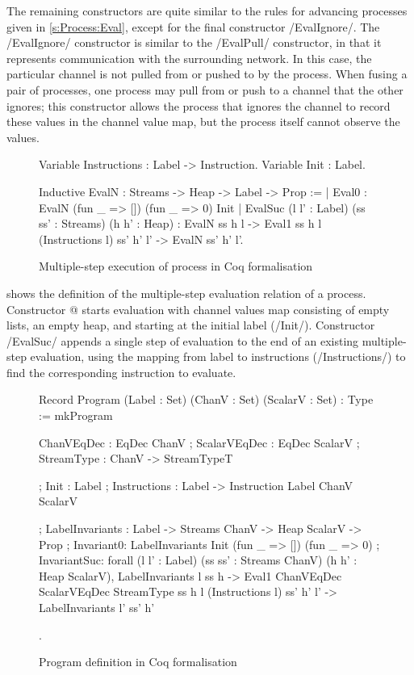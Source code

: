 The remaining constructors are quite similar to the rules for advancing processes given in \cref{s:Process:Eval}, except for the final constructor \Hs/EvalIgnore/.
The \Hs/EvalIgnore/ constructor is similar to the \Hs/EvalPull/ constructor, in that it represents communication with the surrounding network.
In this case, the particular channel is not pulled from or pushed to by the process.
When fusing a pair of processes, one process may pull from or push to a channel that the other ignores; this constructor allows the process that ignores the channel to record these values in the channel value map, but the process itself cannot observe the values.

\begin{figure}
\begin{coq}
Variable Instructions : Label -> Instruction.
Variable Init         : Label.

Inductive EvalN : Streams -> Heap -> Label -> Prop :=
  | Eval0
     : EvalN (fun _ => []) (fun _ => 0) Init
  | EvalSuc (l l' : Label) (ss ss' : Streams) (h h' : Heap)
     : EvalN ss h l
    -> Eval1 ss h l (Instructions l) ss' h' l'
    -> EvalN                         ss' h' l'.
\end{coq}
\caption{Multiple-step execution of process in Coq formalisation}
\label{figs/coq/multi-step}
\end{figure}

 shows the definition of the multiple-step evaluation relation of a process.
Constructor @ starts evaluation with channel values map consisting of empty lists, an empty heap, and starting at the initial label (\Hs/Init/).
Constructor \Hs/EvalSuc/ appends a single step of evaluation to the end of an existing multiple-step evaluation, using the mapping from label to instructions (\Hs/Instructions/) to find the corresponding instruction to evaluate.

\begin{figure}
\begin{coq}
Record Program (Label : Set) (ChanV : Set) (ScalarV : Set) : Type
 := mkProgram
  { ChanVEqDec      : EqDec ChanV
  ; ScalarVEqDec    : EqDec ScalarV
  ; StreamType      : ChanV -> StreamTypeT

  ; Init            : Label
  ; Instructions    : Label -> Instruction Label ChanV ScalarV

  ; LabelInvariants : Label -> Streams ChanV -> Heap ScalarV -> Prop
  ; Invariant0:
      LabelInvariants Init (fun _ => []) (fun _ => 0)
  ; InvariantSuc:
       forall (l l' : Label) (ss ss' : Streams ChanV)
                             (h h' : Heap ScalarV),
       LabelInvariants l ss h
    -> Eval1 ChanVEqDec ScalarVEqDec StreamType
                       ss h l (Instructions l) ss' h' l'
    -> LabelInvariants l' ss' h'
  }.
\end{coq}
\caption{Program definition in Coq formalisation}
\label{figs/coq/program}
\end{figure}

